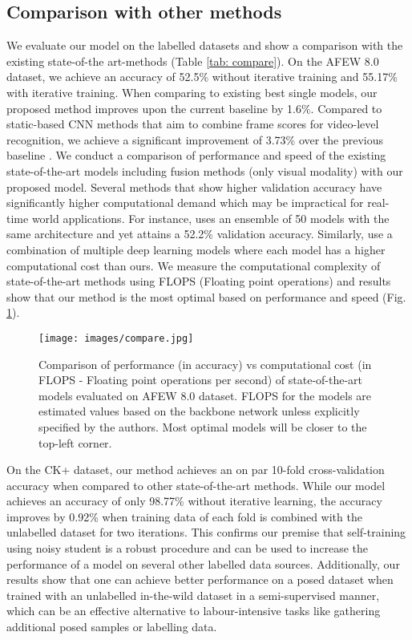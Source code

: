 \documentclass[runningheads]{llncs}
\begin{document}
\subsection{Comparison with other methods} \label{sec: compare}
We evaluate our model on the labelled datasets and show a comparison with the existing state-of-the art-methods (Table \ref{tab: compare}). On the AFEW 8.0 dataset, we achieve an accuracy of 52.5\% without iterative training and 55.17\% with iterative training. When comparing to existing best single models, our proposed method improves upon the current baseline \cite{lu2018multiple} by 1.6\%. Compared to static-based CNN methods that aim to combine frame scores for video-level recognition, we achieve a significant improvement of 3.73\% over the previous baseline \cite{liu2018multi}. We conduct a comparison of performance and speed of the existing state-of-the-art models including fusion methods (only visual modality) with our proposed model. Several methods that show higher validation accuracy have significantly higher computational demand which may be impractical for real-time world applications. For instance, \cite{vielzeuf2018occam} uses an ensemble of 50 models with the same architecture and yet attains a 52.2\% validation accuracy. Similarly, \cite{lu2018multiple,liu2018multi} use a combination of multiple deep learning models where each model has a higher computational cost than ours. We measure the computational complexity of state-of-the-art methods using FLOPS (Floating point operations) and results show that our method is the most optimal based on performance and speed (Fig. \ref{fig:compare}).


 \begin{figure}[t!]
\centering
\texttt{[image: images/compare.jpg]}
\caption{Comparison of performance (in accuracy) vs computational cost (in FLOPS - Floating point operations per second) of state-of-the-art models evaluated on AFEW 8.0 dataset. FLOPS for the models are estimated values based on the backbone network unless explicitly specified by the authors. Most optimal models will be closer to the top-left corner.}
\label{fig:compare}
\end{figure}
 
On the CK+ dataset, our method achieves an on par 10-fold cross-validation accuracy when compared to other state-of-the-art methods. While our model achieves an accuracy of only 98.77\% without iterative learning, the accuracy improves by 0.92\% when training data of each fold is combined with the unlabelled dataset for two iterations. This confirms our premise that self-training using noisy student is a robust procedure and can be used to increase the performance of a model on several other labelled data sources. Additionally, our results show that one can achieve better performance on a posed dataset when trained with an unlabelled in-the-wild dataset in a semi-supervised manner, which can be an effective alternative to labour-intensive tasks like gathering additional posed samples or labelling data.
\end{document}

